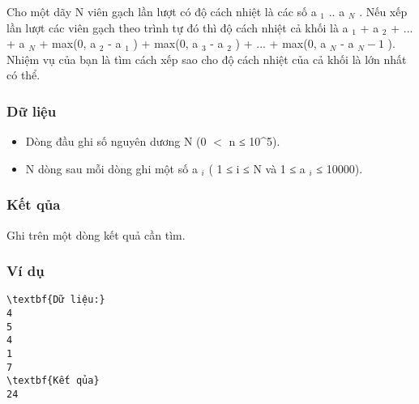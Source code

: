 



   Cho một dãy N viên gạch lần lượt có độ cách nhiệt là các số a   $_    1   $   .. a   $_    N   $   . Nếu xếp lần lượt các viên gạch theo trình tự đó thì độ cách nhiệt cả khối là a   $_    1   $   + a   $_    2   $   + ... + a   $_    N   $   + max(0, a   $_    2   $   - a   $_    1   $   ) + max(0, a   $_    3   $   - a   $_    2   $   ) + ... + max(0, a   $_    N   $   - a   $_    N - 1   $   ). Nhiệm vụ của bạn là tìm cách xếp sao cho độ cách nhiệt của cả khối là lớn nhất có thể.  

\subsubsection{   Dữ liệu  }
\begin{itemize}
	\item     Dòng đầu ghi số nguyên dương N (0 $<$ n ≤ 10^5).   
	\item     N dòng sau mỗi dòng ghi một số a    $_     i    $    ( 1 ≤ i ≤ N và 1 ≤ a    $_     i    $    ≤ 10000).   
\end{itemize}

\subsubsection{   Kết qủa  }

   Ghi trên một dòng kết quả cần tìm.  

\subsubsection{   Ví dụ  }
\begin{verbatim}
\textbf{Dữ liệu:} 
4
5
4
1
7
\textbf{Kết qủa} 
24 
\end{verbatim}
